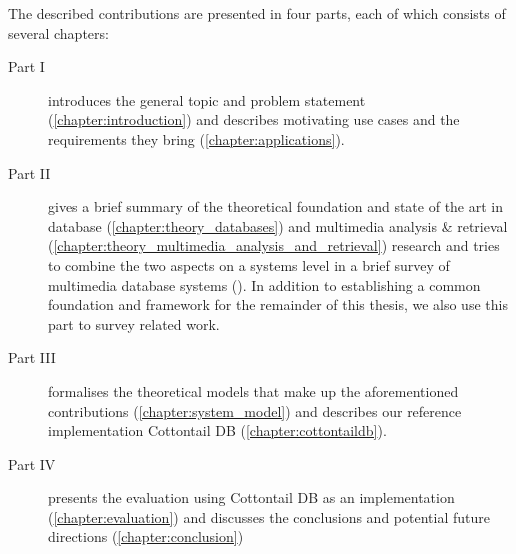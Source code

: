 The described contributions are presented in four parts, each of which consists of several chapters:

\begin{description}
    \item[Part I] introduces the general topic and problem statement (\cref{chapter:introduction}) and describes motivating use cases and the requirements they bring (\cref{chapter:applications}).
    \item[Part II] gives a brief summary of the theoretical foundation and state of the art in database (\cref{chapter:theory_databases}) and multimedia analysis \& retrieval (\cref{chapter:theory_multimedia_analysis_and_retrieval}) research and tries to combine the two aspects on a systems level in a brief survey of multimedia database systems (). In addition to establishing a common foundation and framework for the remainder of this thesis, we also use this part to survey related work.
    \item[Part III] formalises the theoretical models that make up the aforementioned contributions (\cref{chapter:system_model}) and describes our reference implementation Cottontail DB (\cref{chapter:cottontaildb}).
    \item[Part IV] presents the evaluation using Cottontail DB as an implementation (\cref{chapter:evaluation}) and discusses the conclusions and potential future directions (\cref{chapter:conclusion})
\end{description}